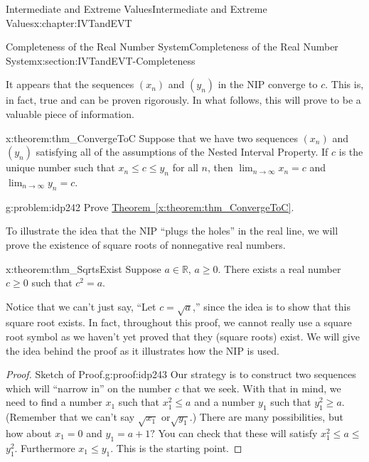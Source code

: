 \begin{chapterptx}{Intermediate and Extreme Values}{}{Intermediate and Extreme Values}{}{}{x:chapter:IVTandEVT}
\begin{sectionptx}{Completeness of the Real Number System}{}{Completeness of the Real Number System}{}{}{x:section:IVTandEVT-Completeness}
		\par
		It appears that the sequences \(\left(x_n\right)\) and \(\left(y_n\right)\) in the NIP converge to \(c\). This is, in fact, true and can be proven rigorously. In what follows, this will prove to be a valuable piece of information.%
		\begin{theorem}{}{}{x:theorem:thm_ConvergeToC}%
			 Suppose that we have two sequences \(\left(x_n\right)\) and \(\left(y_n\right)\) satisfying all of the assumptions of the Nested Interval Property. If \(c\) is the unique number such that \(x_n\leq c\leq y_n\) for all \(n\), then \(\lim_{n\rightarrow\infty}x_n=c\) and \(\lim_{n\rightarrow\infty}y_n=c\).%
		\end{theorem}
		\begin{problem}{}{g:problem:idp242}%
			 Prove \hyperref[x:theorem:thm_ConvergeToC]{Theorem~{\xreffont\ref{x:theorem:thm_ConvergeToC}}}.%
		\end{problem}
		To illustrate the idea that the NIP ``plugs the holes'' in the real line, we will prove the existence of square roots of nonnegative real numbers.%
		\begin{theorem}{}{}{x:theorem:thm_SqrtsExist}%
			Suppose \(a\in\mathbb{R},\,a\geq 0\). There exists a real number \(c\geq 0\) such that \(c^2=a\).%
		\end{theorem}
		Notice that we can't just say, ``Let \(c=\sqrt{a}\),'' since the idea is to show that this square root exists. In fact, throughout this proof, we cannot really use a square root symbol as we haven't yet proved that they (square roots) exist. We will give the idea behind the proof as it illustrates how the NIP is used.%
		\begin{proof}{Sketch of Proof.}{g:proof:idp243}
			Our strategy is to construct two sequences which will ``narrow in'' on the number \(c\) that we seek. With that in mind, we need to find a number \(x_1\) such that \(x_1^2\leq a\) and a number \(y_1\) such that \(y_1^2\geq a\). (Remember that we can't say \(\sqrt{x_1}\) or\(\sqrt{y_1}\).) There are many possibilities, but how about \(x_1=0\) and \(y_1=a+1?\) You can check that these will satisfy \(x_1^2\leq a\leq\) \(y_1^2\). Furthermore \(x_1\leq y_1\). This is the starting point.%
			\par

\end{proof}
\end{sectionptx}
\end{chapterptx}

